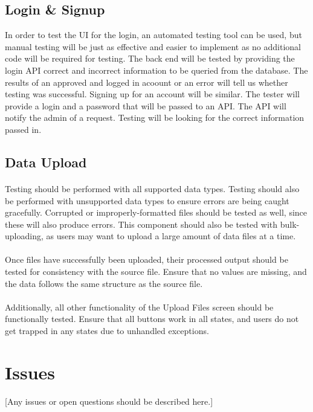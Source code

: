 \documentclass[12pt,oneside,letterpaper]{article}
\begin{document}
\subsection{Login \& Signup}
In order to test the UI for the login, an automated testing tool can be used, but manual testing will be just as effective and easier to implement as no additional code will be required for testing. The back end will be tested by providing the login API correct and incorrect information to be queried from the database. The results of an approved and logged in acoount or an error will tell us whether testing was successful.
Signing up for an account will be similar. The tester will provide a login and a password that will be passed to an API. The API will notify the admin of a request. Testing will be looking for the correct information passed in.

\subsection{Data Upload}
\paragraph{} Testing should be performed with all supported data types. Testing should also be performed with unsupported data types to ensure errors are being caught gracefully. Corrupted or improperly-formatted files should be tested as well, since these will also produce errors. This component should also be tested with bulk-uploading, as users may want to upload a large amount of data files at a time.
\paragraph{} Once files have successfully been uploaded, their processed output should be tested for consistency with the source file. Ensure that no values are missing, and the data follows the same structure as the source file.
\paragraph{} Additionally, all other functionality of the Upload Files screen should be functionally tested. Ensure that all buttons work in all states, and users do not get trapped in any states due to unhandled exceptions.

\section{Issues}
[Any issues or open questions should be described here.]
\end{document}
